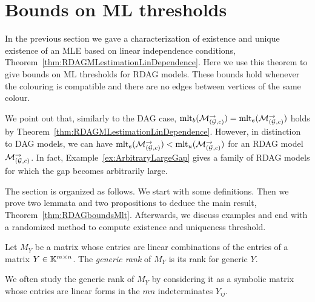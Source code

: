 \section{Bounds on ML thresholds} \label{sec:ThresholdsRDAG}


In the previous section we gave a characterization of existence and unique existence of an MLE based on linear independence conditions, Theorem~\ref{thm:RDAGMLestimationLinDependence}. Here we use this theorem to give bounds on ML thresholds for RDAG models. These bounds hold whenever the colouring is compatible and there are no edges between vertices of the same colour.

We point out that, similarly to the DAG case, $\operatorname{mlt}_b(\mathcal{M}_{(\mathcal{G}, c)}^{\to}) = \operatorname{mlt}_e(\mathcal{M}_{(\mathcal{G}, c)}^{\to})$ holds by Theorem~\ref{thm:RDAGMLestimationLinDependence}. However, in distinction to DAG models, we can have $\operatorname{mlt}_e(\mathcal{M}_{(\mathcal{G}, c)}^{\to}) < \operatorname{mlt}_u(\mathcal{M}_{(\mathcal{G}, c)}^{\to})$ for an RDAG model $\mathcal{M}_{(\mathcal{G}, c)}^{\to}$. In fact, Example~\ref{ex:ArbitraryLargeGap} gives a family of RDAG models for which the gap becomes arbitrarily large.

The section is organized as follows. We start with some definitions. Then we prove two lemmata and two propositions to deduce the main result, Theorem~\ref{thm:RDAGboundsMlt}. Afterwards, we discuss examples and end with a randomized method to compute existence and uniqueness threshold.

\medskip

\begin{defn}	\label{def:rs} 
	Let $M_Y$ be a matrix whose entries are linear combinations of the entries of a matrix $Y \in \mathbb K^{m \times n}$. 
	The \emph{generic rank} of $M_Y$ is its rank for generic $Y$.
	\hfill{}
\end{defn}

We often study the generic rank of $M_Y$ by considering it as a symbolic matrix whose entries are linear forms in the $mn$ indeterminates $Y_{ij}$.


